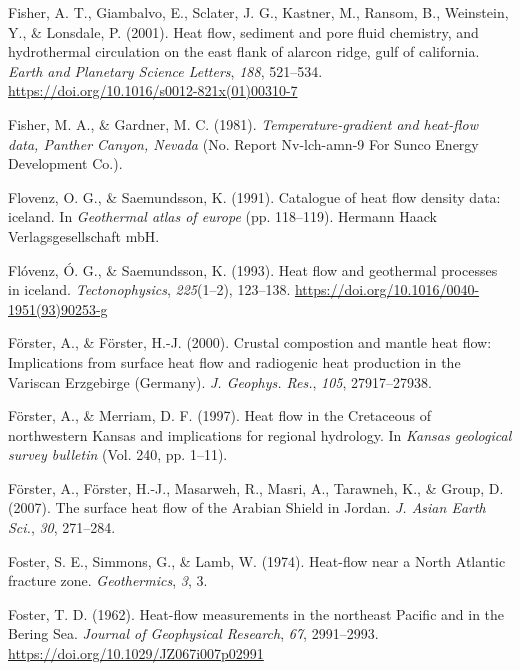 \begin{CSLReferences}{1}{1}
\leavevmode{}%
Fisher, A. T., Giambalvo, E., Sclater, J. G., Kastner, M., Ransom, B., Weinstein, Y., \& Lonsdale, P. (2001). Heat flow, sediment and pore fluid chemistry, and hydrothermal circulation on the east flank of alarcon ridge, gulf of california. \emph{Earth and Planetary Science Letters}, \emph{188}, 521--534. \url{https://doi.org/10.1016/s0012-821x(01)00310-7}

\leavevmode{}%
Fisher, M. A., \& Gardner, M. C. (1981). \emph{Temperature-gradient and heat-flow data, {Panther Canyon, Nevada}} (No. Report Nv-lch-amn-9 For Sunco Energy Development Co.).

\leavevmode{}%
Flovenz, O. G., \& Saemundsson, K. (1991). Catalogue of heat flow density data: iceland. In \emph{Geothermal atlas of europe} (pp. 118--119). Hermann Haack Verlagsgesellschaft mbH.

\leavevmode{}%
Flóvenz, Ó. G., \& Saemundsson, K. (1993). Heat flow and geothermal processes in iceland. \emph{Tectonophysics}, \emph{225}(1--2), 123--138. \url{https://doi.org/10.1016/0040-1951(93)90253-g}

\leavevmode{}%
Förster, A., \& Förster, H.-J. (2000). Crustal compostion and mantle heat flow: Implications from surface heat flow and radiogenic heat production in the {Variscan Erzgebirge (Germany)}. \emph{J. Geophys. Res.}, \emph{105}, 27917--27938.

\leavevmode{}%
Förster, A., \& Merriam, D. F. (1997). Heat flow in the {Cretaceous} of northwestern {Kansas} and implications for regional hydrology. In \emph{Kansas geological survey bulletin} (Vol. 240, pp. 1--11).

\leavevmode{}%
Förster, A., Förster, H.-J., Masarweh, R., Masri, A., Tarawneh, K., \& Group, D. (2007). The surface heat flow of the {Arabian Shield in Jordan}. \emph{J. Asian Earth Sci.}, \emph{30}, 271--284.

\leavevmode{}%
Foster, S. E., Simmons, G., \& Lamb, W. (1974). Heat-flow near a {North Atlantic} fracture zone. \emph{Geothermics}, \emph{3}, 3.

\leavevmode{}%
Foster, T. D. (1962). Heat-flow measurements in the northeast {Pacific} and in the {Bering Sea}. \emph{Journal of Geophysical Research}, \emph{67}, 2991--2993. \url{https://doi.org/10.1029/JZ067i007p02991}


\end{CSLReferences}
